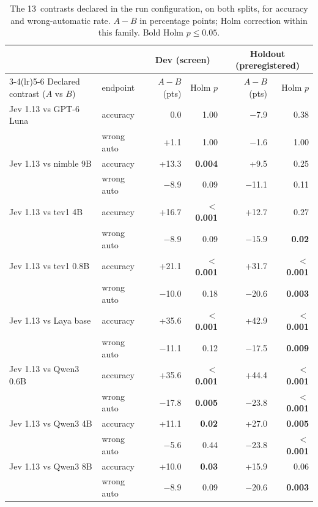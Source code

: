 \documentclass[11pt,letterpaper]{article}
\newcommand{\HoldPairwiseFamily}{13}
\begin{document}
\begin{table}[tbp]
\centering\small
\caption{The \HoldPairwiseFamily\ contrasts declared in the run configuration, on both splits, for
accuracy and wrong-automatic rate. $A-B$ in percentage points; Holm correction within this family.
Bold Holm $p \le 0.05$.}
\label{jb:tab:pairwise}
\begin{tabular*}{\textwidth}{@{\extracolsep{\fill}}l l r r r r@{}}
\toprule
 & & \multicolumn{2}{c}{Dev (screen)} & \multicolumn{2}{c}{Holdout (preregistered)} \\
\cmidrule(lr){3-4}\cmidrule(lr){5-6}
Declared contrast ($A$ vs $B$) & endpoint & $A-B$ (pts) & Holm $p$ & $A-B$ (pts) & Holm $p$ \\
\midrule
Jev 1.13 vs GPT-6 Luna & accuracy & 0.0 & 1.00 & $-$7.9 & 0.38 \\
 & wrong auto & +1.1 & 1.00 & $-$1.6 & 1.00 \\
\addlinespace[2pt]
Jev 1.13 vs nimble 9B & accuracy & +13.3 & \textbf{0.004} & +9.5 & 0.25 \\
 & wrong auto & $-$8.9 & 0.09 & $-$11.1 & 0.11 \\
\addlinespace[2pt]
Jev 1.13 vs tev1 4B & accuracy & +16.7 & \textbf{$<$0.001} & +12.7 & 0.27 \\
 & wrong auto & $-$8.9 & 0.09 & $-$15.9 & \textbf{0.02} \\
\addlinespace[2pt]
Jev 1.13 vs tev1 0.8B & accuracy & +21.1 & \textbf{$<$0.001} & +31.7 & \textbf{$<$0.001} \\
 & wrong auto & $-$10.0 & 0.18 & $-$20.6 & \textbf{0.003} \\
\addlinespace[2pt]
Jev 1.13 vs Laya base & accuracy & +35.6 & \textbf{$<$0.001} & +42.9 & \textbf{$<$0.001} \\
 & wrong auto & $-$11.1 & 0.12 & $-$17.5 & \textbf{0.009} \\
\addlinespace[2pt]
Jev 1.13 vs Qwen3 0.6B & accuracy & +35.6 & \textbf{$<$0.001} & +44.4 & \textbf{$<$0.001} \\
 & wrong auto & $-$17.8 & \textbf{0.005} & $-$23.8 & \textbf{$<$0.001} \\
\addlinespace[2pt]
Jev 1.13 vs Qwen3 4B & accuracy & +11.1 & \textbf{0.02} & +27.0 & \textbf{0.005} \\
 & wrong auto & $-$5.6 & 0.44 & $-$23.8 & \textbf{$<$0.001} \\
\addlinespace[2pt]
Jev 1.13 vs Qwen3 8B & accuracy & +10.0 & \textbf{0.03} & +15.9 & 0.06 \\
 & wrong auto & $-$8.9 & 0.09 & $-$20.6 & \textbf{0.003} \\

\end{tabular*}
\end{table}
\end{document}
